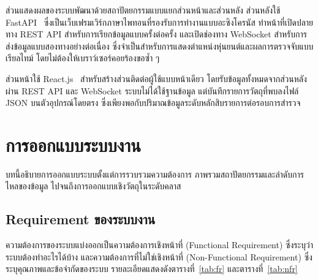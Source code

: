 \documentclass[a4paper,12pt]{report}
\begin{document}
ส่วนแสดงผลของระบบพัฒนาด้วยสถาปัตยกรรมแบบแยกส่วนหน้าและส่วนหลัง
ส่วนหลังใช้ FastAPI~\cite{fastapi} ซึ่งเป็นเว็บเฟรมเวิร์กภาษาไพทอนที่รองรับการทำงานแบบอะซิงโครนัส
ทำหน้าที่เปิดปลายทาง REST API สำหรับการเรียกข้อมูลแบบครั้งต่อครั้ง
และเปิดช่องทาง WebSocket สำหรับการส่งข้อมูลแบบสองทางอย่างต่อเนื่อง
ซึ่งจำเป็นสำหรับการแสดงตำแหน่งหุ่นยนต์และผลการตรวจจับแบบเรียลไทม์
โดยไม่ต้องให้เบราว์เซอร์คอยร้องขอซ้ำ ๆ

ส่วนหน้าใช้ React.js~\cite{react} สำหรับสร้างส่วนติดต่อผู้ใช้แบบหน้าเดียว
โดยรับข้อมูลทั้งหมดจากส่วนหลังผ่าน REST API และ WebSocket
ระบบไม่ได้ใช้ฐานข้อมูล แต่บันทึกรายการวัตถุที่พบลงไฟล์ JSON บนตัวอุปกรณ์โดยตรง
ซึ่งเพียงพอกับปริมาณข้อมูลระดับหลักสิบรายการต่อรอบการสำรวจ

\chapter{การออกแบบระบบงาน}

บทนี้อธิบายการออกแบบระบบตั้งแต่การรวบรวมความต้องการ
ภาพรวมสถาปัตยกรรมและลำดับการไหลของข้อมูล
ไปจนถึงการออกแบบเชิงวัตถุในระดับคลาส

\section{Requirement ของระบบงาน}

ความต้องการของระบบแบ่งออกเป็นความต้องการเชิงหน้าที่ (Functional Requirement)
ซึ่งระบุว่าระบบต้องทำอะไรได้บ้าง และความต้องการที่ไม่ใช่เชิงหน้าที่
(Non-Functional Requirement) ซึ่งระบุคุณภาพและข้อจำกัดของระบบ
รายละเอียดแสดงดังตารางที่~\ref{tab:fr} และตารางที่~\ref{tab:nfr}
\end{document}
